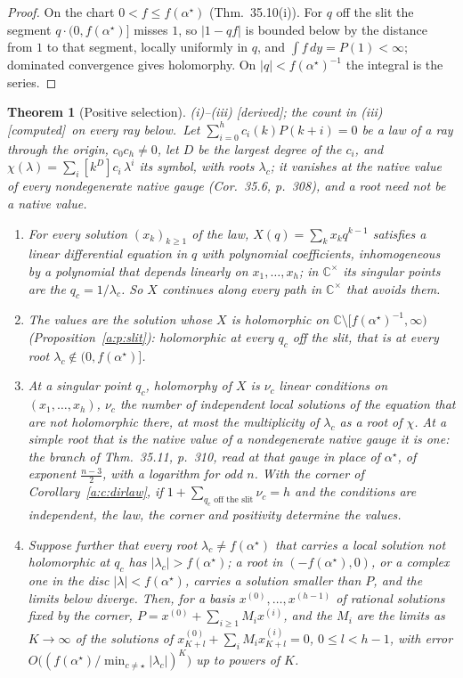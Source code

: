 \documentclass[11pt]{article}
\theoremstyle{plain}
\newtheorem{theorem}[proposition]{Theorem}
\theoremstyle{definition}
\theoremstyle{remark}
\newcommand{\derived}{\textup{[derived]}}
\newcommand{\computed}{\textup{[computed]}}
\begin{document}
\begin{proof}
On the chart $0<f\le f(\alpha^\star)$ (Thm.~35.10(i)). For $q$ off the slit the segment $q\cdot(0,f(\alpha^\star)]$ misses $1$, so $|1-qf|$ is bounded below by the distance from $1$ to that segment, locally uniformly in $q$, and $\int f\,dy=P(1)<\infty$; dominated convergence gives holomorphy. On $|q|<f(\alpha^\star)^{-1}$ the integral is the series.
\end{proof}

\begin{theorem}[Positive selection]\label{a:t:select}(i)--(iii) \derived; the count in (iii) \computed\ on every ray below.\
Let $\sum_{i=0}^hc_i(k)P(k+i)=0$ be a law of a ray through the origin, $c_0c_h\ne0$, let $D$ be the largest degree of the $c_i$, and $\chi(\lambda)=\sum_i[k^D]c_i\,\lambda^i$ its symbol, with roots $\lambda_c$; it vanishes at the native value of every nondegenerate native gauge (Cor.~35.6, p.~308), and a root need not be a native value.
\begin{enumerate}[label=(\roman*)]
\item For every solution $(x_k)_{k\ge1}$ of the law, $X(q)=\sum_kx_kq^{k-1}$ satisfies a linear differential equation in $q$ with polynomial coefficients, inhomogeneous by a polynomial that depends linearly on $x_1,\dots,x_h$; in $\mathbb C^\times$ its singular points are the $q_c=1/\lambda_c$. So $X$ continues along every path in $\mathbb C^\times$ that avoids them.
\item The values are the solution whose $X$ is holomorphic on $\mathbb C\setminus[f(\alpha^\star)^{-1},\infty)$ (Proposition~\ref{a:p:slit}): holomorphic at every $q_c$ off the slit, that is at every root $\lambda_c\notin(0,f(\alpha^\star)]$.
\item At a singular point $q_c$, holomorphy of $X$ is $\nu_c$ linear conditions on $(x_1,\dots,x_h)$, $\nu_c$ the number of independent local solutions of the equation that are not holomorphic there, at most the multiplicity of $\lambda_c$ as a root of $\chi$. At a simple root that is the native value of a nondegenerate native gauge it is one: the branch of Thm.~35.11, p.~310, read at that gauge in place of $\alpha^\star$, of exponent $\frac{n-3}2$, with a logarithm for odd $n$. With the corner of Corollary~\ref{a:c:dirlaw}, if $1+\sum_{q_c\text{ off the slit}}\nu_c=h$ and the conditions are independent, the law, the corner and positivity determine the values.
\item Suppose further that every root $\lambda_c\neq f(\alpha^\star)$ that carries a local solution not holomorphic at $q_c$ has $|\lambda_c|>f(\alpha^\star)$; a root in $(-f(\alpha^\star),0)$, or a complex one in the disc $|\lambda|<f(\alpha^\star)$, carries a solution smaller than $P$, and the limits below diverge. Then, for a basis $x^{(0)},\dots,x^{(h-1)}$ of rational solutions fixed by the corner, $P=x^{(0)}+\sum_{i\ge1}M_ix^{(i)}$, and the $M_i$ are the limits as $K\to\infty$ of the solutions of $x^{(0)}_{K+l}+\sum_iM_ix^{(i)}_{K+l}=0$, $0\le l<h-1$, with error $O\big((f(\alpha^\star)/\min_{c\ne\star}|\lambda_c|)^K\big)$ up to powers of $K$.
\end{enumerate}
\end{theorem}
\end{document}
